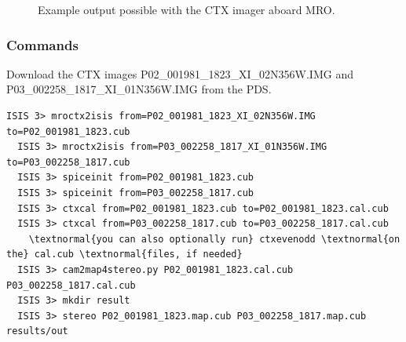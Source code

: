 \begin{figure}[b!]
\centering
  \hfil
\caption{Example output possible with the CTX imager aboard MRO.}
\label{fig:ctx_example}
\end{figure}

\subsubsection*{Commands}

Download the \ac{CTX} images P02\_001981\_1823\_XI\_02N356W.IMG and
P03\_002258\_1817\_XI\_01N356W.IMG from the \ac{PDS}.
\begin{Verbatim}[commandchars=\\\{\}]
  ISIS 3> mroctx2isis from=P02_001981_1823_XI_02N356W.IMG to=P02_001981_1823.cub
  ISIS 3> mroctx2isis from=P03_002258_1817_XI_01N356W.IMG to=P03_002258_1817.cub
  ISIS 3> spiceinit from=P02_001981_1823.cub
  ISIS 3> spiceinit from=P03_002258_1817.cub
  ISIS 3> ctxcal from=P02_001981_1823.cub to=P02_001981_1823.cal.cub
  ISIS 3> ctxcal from=P03_002258_1817.cub to=P03_002258_1817.cal.cub
    \textnormal{you can also optionally run} ctxevenodd \textnormal{on the} cal.cub \textnormal{files, if needed}
  ISIS 3> cam2map4stereo.py P02_001981_1823.cal.cub P03_002258_1817.cal.cub
  ISIS 3> mkdir result
  ISIS 3> stereo P02_001981_1823.map.cub P03_002258_1817.map.cub results/out
\end{Verbatim}


